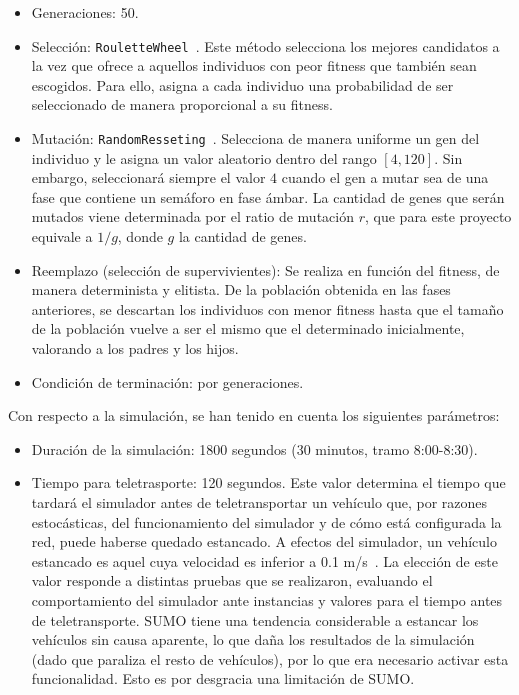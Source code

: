 \begin{itemize}
    \item Generaciones: 50. 
    \item Selección: \texttt{RouletteWheel}~\cite{lipowski_roulette-wheel_2012}. Este método selecciona los mejores candidatos a la vez que ofrece a aquellos individuos con peor fitness que también sean escogidos. Para ello, asigna a cada individuo una probabilidad de ser seleccionado de manera proporcional a su fitness.
    \item Mutación: \texttt{RandomResseting}~\cite{abrante_dorta_framework_2019}. Selecciona de manera uniforme un gen del individuo y le asigna un valor aleatorio dentro del rango $[4,120]$. Sin embargo, seleccionará siempre el valor $4$ cuando el gen a mutar sea de una fase que contiene un semáforo en fase ámbar. La cantidad de genes que serán mutados viene determinada por el ratio de mutación $r$, que para este proyecto equivale a $1 / g$, donde $g$ la cantidad de genes.
    \item Reemplazo (selección de supervivientes): Se realiza en función del fitness, de manera determinista y elitista. De la población obtenida en las fases anteriores, se descartan los individuos con menor fitness hasta que el tamaño de la población vuelve a ser el mismo que el determinado inicialmente, valorando a los padres y los hijos.
    \item Condición de terminación: por generaciones.
\end{itemize}


Con respecto a la simulación, se han tenido en cuenta los siguientes parámetros:

\begin{itemize}
    \item Duración de la simulación: 1800 segundos (30 minutos, tramo 8:00-8:30).
    \item Tiempo para teletrasporte: 120 segundos. Este valor determina el tiempo que tardará el simulador antes de teletransportar un vehículo que, por razones estocásticas, del funcionamiento del simulador y de cómo está configurada la red, puede haberse quedado estancado. A efectos del simulador, un vehículo estancado es aquel cuya velocidad es inferior a 0.1 m/s~\cite{noauthor_simulationwhy_nodate}. La elección de este valor responde a distintas pruebas que se realizaron, evaluando el comportamiento del simulador ante instancias y valores para el tiempo antes de teletransporte. SUMO tiene una tendencia considerable a estancar los vehículos sin causa aparente, lo que daña los resultados de la simulación (dado que paraliza el resto de vehículos), por lo que era necesario activar esta funcionalidad. Esto es por desgracia una limitación de SUMO.
\end{itemize}

